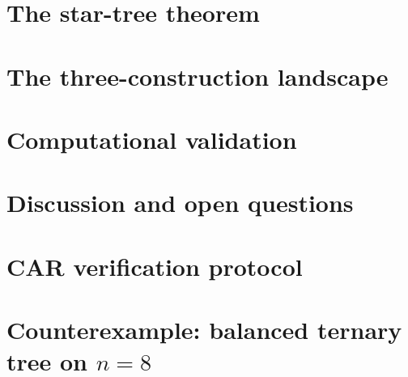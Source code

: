 \documentclass[aps,pra,preprint,superscriptaddress,showpacs]{revtex4-2}
\theoremstyle{definition}
\theoremstyle{remark}
\begin{document}
\section{The star-tree theorem}
\label{sec:star-tree}


\section{The three-construction landscape}
\label{sec:landscape}


\section{Computational validation}
\label{sec:validation}


\section{Discussion and open questions}
\label{sec:discussion}


\appendix

\section{CAR verification protocol}
\label{app:car-verification}


\section{Counterexample: balanced ternary tree on \texorpdfstring{$n = 8$}{n=8}}
\label{app:counterexample}

\end{document}
